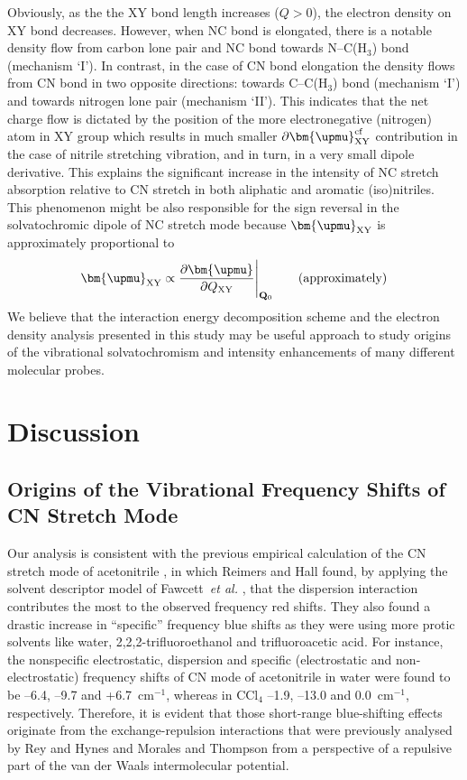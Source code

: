 \documentclass[a4paper,titlepage,twoside,fleqn,12pt]{book}
\newcommand{\BM}[1]{\bm{#1}}
\newcommand{\fderiv}[2]{\ensuremath{
    \frac{\partial #1}{\partial #2}}}
\begin{document}
\begin{refsection}
Obviously, as the
the XY bond length increases ($Q>0$), the electron density on XY bond decreases. However, 
when NC bond is elongated, there is a notable density flow from carbon lone pair and NC 
bond towards N--C(H$_3$) bond (mechanism `I'). In contrast, in the case of CN bond elongation 
the density flows from CN bond in two opposite directions: towards C--C(H$_3$) bond 
(mechanism `I') and towards nitrogen lone pair (mechanism `II'). This indicates that the net 
charge flow is dictated by the position of the more electronegative (nitrogen) atom in XY group 
which results in much smaller $\partial {\BM \upmu}_{\rm XY}^{\rm cf}$ contribution in the case of
nitrile stretching vibration,
and in turn, in a very small dipole derivative. This explains the significant increase in the 
intensity of NC stretch absorption relative to CN stretch in both aliphatic and aromatic 
(iso)nitriles. This phenomenon might be also responsible for the sign reversal in the
solvatochromic dipole of NC stretch mode because ${\BM \upmu}_{\rm XY}$ is approximately proportional to
%
\begin{equation}
 {\BM \upmu}_{\rm XY} \propto \fderiv{{\BM \upmu}}{Q_{\rm XY}} \Bigg|_{{\bf Q}_{0}} 
    \qquad\text{(approximately)}
\end{equation}
%
We believe that the interaction energy decomposition scheme and the electron density
analysis presented in this study may be useful approach to study origins of the vibrational
solvatochromism and intensity enhancements of many different molecular probes.


\section{Discussion}

\subsection{Origins of the Vibrational Frequency Shifts of CN Stretch Mode}

Our analysis is consistent with the previous empirical
calculation of the CN stretch mode of acetonitrile \citep{Reimers.Hall.JACS.1999}, 
in which
Reimers and Hall found, by applying the solvent descriptor
model of Fawcett~\emph{et al.} \citep{Fawcett.Liu.Kessler.JPC.1993}, 
that the dispersion interaction
contributes the most to the observed frequency red shifts.
They also found a drastic increase in ``specific'' frequency blue
shifts as they were using more protic solvents like water, 
2,2,2\hyp{}trifluoroethanol and trifluoroacetic acid. For instance, the nonspecific
electrostatic, dispersion and specific (electrostatic and
non-electrostatic) frequency shifts of CN mode of acetonitrile
in water were found to be --6.4, --9.7 and +6.7~cm$^{-1}$, whereas in
CCl$_4$ --1.9, --13.0 and 0.0~cm$^{-1}$, respectively. Therefore, it is
evident that those short\hyp{}range blue\hyp{}shifting effects originate
from the exchange\hyp{}repulsion interactions that were previously
analysed by Rey and Hynes \citep{Rey.Hynes.JCP.1998} 
and Morales and Thompson \citep{Morales.Thompson.JPCB.2011}
from a perspective of a repulsive part of the van der Waals
intermolecular potential.


\end{refsection}
\end{document}
